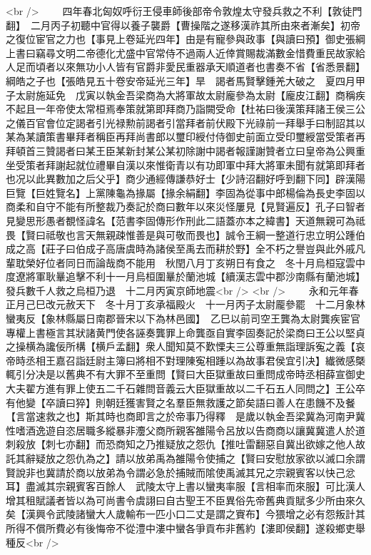 <br />
　　四年春北匈奴呼衍王侵車師後部帝令敦煌太守發兵救之不利【敦徒門翻】　二月丙子初聽中官得以養子襲爵【曹操階之遂移漢祚其所由來者漸矣】初帝之復位宦官之力也【事見上卷延光四年】由是有寵參與政事【與讀曰預】御史張綱上書曰竊尋文明二帝德化尤盛中官常侍不過兩人近倖賞賜裁滿數金惜費重民故家給人足而頃者以來無功小人皆有官爵非愛民重器承天順道者也書奏不省【省悉景翻】綱皓之子也【張皓見五十卷安帝延光三年】旱　謁者馬賢擊鍾羌大破之　夏四月甲子太尉施延免　戊寅以執金吾梁商為大將軍故太尉龐參為太尉【龐皮江翻】商稱疾不起且一年帝使太常桓焉奉策就第即拜商乃詣闕受命【杜祐曰後漢策拜諸王侯三公之儀百官會位定謁者引光禄勲前謁者引當拜者前伏殿下光祿前一拜舉手曰制詔其以某為某讀策書畢拜者稱臣再拜尚書郎以璽印綬付侍御史前面立受印璽綬當受策者再拜頓首三贊謁者曰某王臣某新封某公某初除謝中謁者報謹謝贊者立曰皇帝為公興重坐受策者拜謝起就位禮畢自漢以來惟衛青以有功即軍中拜大將軍未聞有就第即拜者也况以此異數加之后父乎】商少通經傳謙恭好士【少詩沼翻好呼到翻下同】辟漢陽巨覽【巨姓覽名】上黨陳龜為掾屬【掾余絹翻】李固為從事中郎楊倫為長史李固以商柔和自守不能有所整裁乃奏記於商曰數年以來災怪屢見【見賢遍反】孔子曰智者見變思形愚者覩怪諱名【范書李固傳形作刑此二語蓋亦本之緯書】天道無親可為祗畏【賢曰祗敬也言天無親疎惟善是與可敬而畏也】誠令王綱一整道行忠立明公踵伯成之高【莊子曰伯成子高唐虞時為諸侯至禹去而耕於野】全不朽之譽豈與此外戚凡輩耽榮好位者同日而論哉商不能用　秋閏八月丁亥朔日有食之　冬十月烏桓寇雲中度遼將軍耿曅追擊不利十一月烏桓圍曅於蘭池城【續漢志雲中郡沙南縣有蘭池城】發兵數千人救之烏桓乃退　十二月丙寅京師地震<br />
<br />
　　永和元年春正月己巳改元赦天下　冬十月丁亥承福殿火　十一月丙子太尉龎參罷　十二月象林蠻夷反【象林縣屬日南郡晉宋以下為林邑國】　乙巳以前司空王龔為太尉龔疾宦官專權上書極言其狀諸黄門使各誣奏龔罪上命龔亟自實李固奏記於梁商曰王公以堅貞之操横為讒佞所構【横戶孟翻】衆人聞知莫不歎慄夫三公尊重無詣理訴寃之義【哀帝時丞相王嘉召詣廷尉主簿曰將相不對理陳寃相踵以為故事君侯宜引决】纎微感槩輒引分决是以舊典不有大罪不至重問【賢曰大臣獄重故曰重問成帝時丞相薛宣御史大夫翟方進有罪上使五二千石雜問音義云大臣獄重故以二千石五人同問之】王公卒有他變【卒讀曰猝】則朝廷獲害賢之名羣臣無救護之節矣語曰善人在患饑不及餐【言當速救之也】斯其時也商即言之於帝事乃得釋　是歲以執金吾梁冀為河南尹冀性嗜酒逸遊自恣居職多縱暴非灋父商所親客雒陽令呂放以告商商以讓冀冀遣人於道刺殺放【刺七亦翻】而恐商知之乃推疑放之怨仇【推吐雷翻惡自冀出欲嫁之他人故託其辭疑放之怨仇為之】請以放弟禹為雒陽令使捕之【賢曰安慰放家欲以滅口余謂賢說非也冀請於商以放弟為令謂必急於捕賊而隂使禹滅其兄之宗親賓客以快己忿耳】盡滅其宗親賓客百餘人　武陵太守上書以蠻夷率服【言相率而來服】可比漢人增其租賦議者皆以為可尚書令虞詡曰自古聖王不臣異俗先帝舊典貢賦多少所由來久矣【漢興令武陵諸蠻大人歲輸布一匹小口二丈是謂之賨布】今猥增之必有怨叛計其所得不償所費必有後悔帝不從澧中漊中蠻各爭貢布非舊約【漊即侯翻】遂殺鄉吏舉種反<br />
